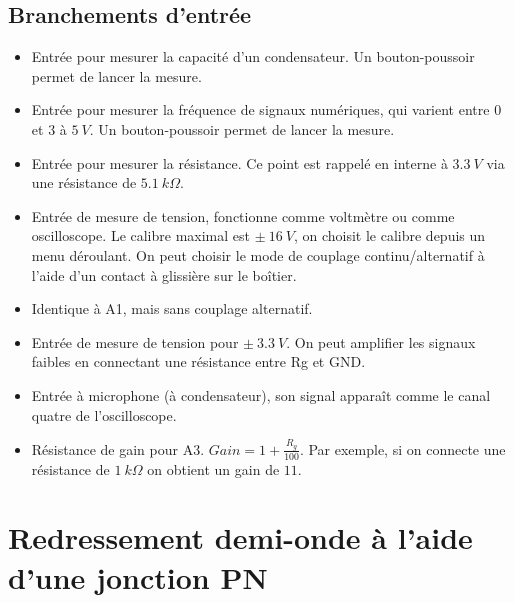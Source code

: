 \documentclass[a4paper,12pt,french]{sphinxmanual}
\begin{document}
\subsection{Branchements d’entrée}
\label{\detokenize{3.1:branchements-d-entree}}\begin{itemize}
\item {} 
 Entrée pour mesurer la capacité d’un condensateur. Un
bouton-poussoir permet de lancer la mesure.

\item {} 
 Entrée pour mesurer la fréquence de signaux numériques, qui
varient entre \(0\) et \(3\) à \(5\ V\).
Un bouton-poussoir permet de lancer la mesure.

\item {} 
 Entrée pour mesurer la résistance. Ce point est rappelé en interne
à \(3.3\ V\) via une résistance de  \(5.1\ k\Omega\).

\item {} 
 Entrée de mesure de tension, fonctionne comme voltmètre ou comme
oscilloscope. Le calibre maximal est \(\pm\ 16\ V\), on choisit
le calibre depuis un menu déroulant. On peut choisir le mode de couplage
continu/alternatif à l’aide d’un contact à glissière sur le boîtier.

\item {} 
 Identique à A1, mais sans couplage alternatif.

\item {} 
 Entrée de mesure de tension pour \(\pm\ 3.3\ V\). On peut
amplifier les signaux faibles en connectant une résistance entre Rg et
GND.

\item {} 
 Entrée à microphone (à condensateur), son signal apparaît comme
le canal quatre de l’oscilloscope.

\item {} 
 Résistance de gain pour A3. \(Gain = 1 + \frac{R_{g}}{100}\).
Par exemple, si on connecte une résistance de \(1\ k\Omega\) on obtient
un gain de \(11\).

\end{itemize}


\section{Redressement demi-onde à l’aide d’une jonction PN}
\label{\detokenize{3.2:redressement-demi-onde-a-laide-dune-jonction-pn}}\label{\detokenize{3.2::doc}}
\end{document}

